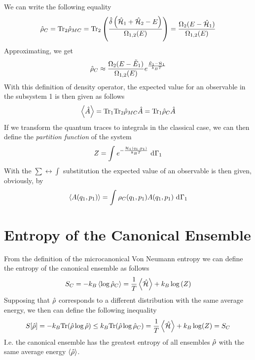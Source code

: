 \documentclass[../qm.tex]{subfiles}
\begin{document}
		We can write the following equality
		\begin{equation}
			\hat{\rho}_C=\mathrm{Tr}_2\hat{\rho}_{MC}=\mathrm{Tr}_2\left( \frac{\hat{\delta}\left( \hat{\mathcal{H}}_1+\hat{\mathcal{H}}_2-E \right)}{\Omega_{1,2}(E)} \right)=\frac{\Omega_2(E-\hat{\mathcal{H}}_1)}{\Omega_{1,2}(E)}
			\label{eq:canonicaloperator}
		\end{equation}
		Approximating, we get
		\begin{equation}
			\hat{\rho}_C\approx\frac{\Omega_2(E-\tilde{E}_1)}{\Omega_{1,2}(E)}e^{\frac{\tilde{E}_1-\hat{\mathcal{H}}_1}{k_BT}}
			\label{eq:canonicaloperatorapprox}
		\end{equation}
		With this definition of density operator, the expected value for an observable in the subsystem 1 is then given as follows
		\begin{equation}
			\expval{\hat{A}}=\mathrm{Tr}_1\mathrm{Tr}_2\hat{\rho}_{MC}\hat{A}=\mathrm{Tr}_1\hat{\rho}_C\hat{A}
			\label{eq:expvalcanonical}
		\end{equation}
		If we transform the quantum traces to integrals in the classical case, we can then define the \textit{partition function} of the system
		\begin{equation}
			Z=\int_{}^{}e^{-\frac{\mathcal{H}_1(q_1,p_1)}{k_BT}}\ \mathrm{d}^{}\Gamma_1
			\label{eq:partitionfunction}
		\end{equation}
		With the $\sum\leftrightarrow\int$ substitution the expected value of an observable is then given, obviously, by
		\begin{equation}
			\expval{A(q_1,p_1)}=\int_{}^{}\rho_C(q_1,p_1)A(q_1,p_1)\ \mathrm{d}^{}\Gamma_1
			\label{eq:expectedvalue}
		\end{equation}
		\section{Entropy of the Canonical Ensemble}
		From the definition of the microcanonical Von Neumann entropy we can define the entropy of the canonical ensemble as follows
		\begin{equation}
			S_C=-k_B\expval{\log\hat{\rho}_C}=\frac{1}{T}\expval{\hat{\mathcal{H}}}+k_B\log\left( Z \right)
			\label{eq:canonicalentropy}
		\end{equation}
		Supposing that $\hat{\rho}$ corresponds to a different distribution with the same average energy, we then can define the following inequality
		\begin{equation}
			S[\hat{\rho}]=-k_B\mathrm{Tr}(\hat{\rho}\log\hat{\rho})\le k_B\mathrm{Tr}(\hat{\rho}\log\hat{\rho}_C)=\frac{1}{T}\expval{\hat{\mathcal{H}}}+k_B\log(Z)=S_C
			\label{eq:canonicalentropydisuguagliance}
		\end{equation}
		I.e. the canonical ensemble has the greatest entropy of all ensembles $\hat{\rho}$ with the same average energy $\expval{\hat{\rho}}$.
\end{document}

